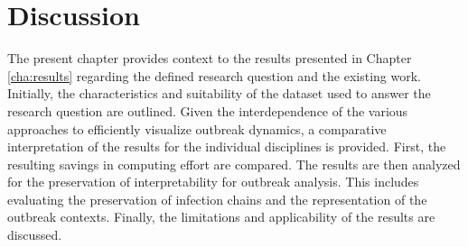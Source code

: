 \section{Discussion}
\label{cha:discussion}
The present chapter provides context to the results presented in Chapter \ref{cha:results} regarding the defined research question and the existing work. Initially, the characteristics and suitability of the dataset used to answer the research question are outlined. 
Given the interdependence of the various approaches to efficiently visualize outbreak dynamics, a comparative interpretation of the results for the individual disciplines is provided. First, the resulting savings in computing effort are compared. The results are then analyzed for the preservation of interpretability for outbreak analysis. This includes evaluating the preservation of infection chains and the representation of the outbreak contexts. Finally, the limitations and applicability of the results are discussed.

